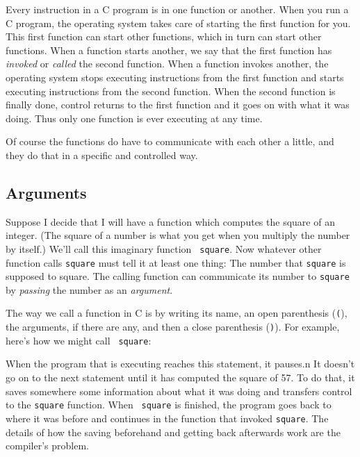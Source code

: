     Every instruction in a C program is in one function or another.
When you run a C program, the operating system takes care of starting
the first function for you.  This first function can start other
functions, which in turn can start other functions.  When a function
starts another, we say that the first function has {\em invoked}\/ or
{\em called}\/ the second function.  When a function invokes another,
the operating system stops executing instructions from the first
function and starts executing instructions from the second function.
When the second function is finally done, control returns to the first
function and it goes on with what it was doing.  Thus only one function
is ever executing at any time.

    Of course the functions do have to communicate with each other a
little, and they do that in a specific and controlled way.

\subsection{Arguments}

   Suppose I decide that I will have a function which computes the
square of an integer.  (The square of a number is what you get when you
multiply the number by itself.)  We'll call this imaginary function {\tt
square}.  Now whatever other function calls {\tt square} must tell it at
least one thing: The number that {\tt square} is supposed to square.
The calling function can communicate its number to {\tt square} by {\em
passing} the number as an {\em argument}.

    The way we call a function in C is by writing its name, an open
parenthesis ({\tt (}), the arguments, if there are any, and then a close
parenthesis ({\tt )}).  For example, here's how we might call {\tt
square}:

\begin{flushleft}
\verb%    square(57);%
\end{flushleft}

When the program that is executing reaches this statement, it pauses.n
It doesn't go on to the next statement until it has computed the square
of 57.  To do that, it saves somewhere some information about what it
was doing and transfers control to the {\tt square} function.  When {\tt
square} is finished, the program goes back to where it was before and
continues in the function that invoked {\tt square}.  The details of how
the saving beforehand and getting back afterwards work are the
compiler's problem.

